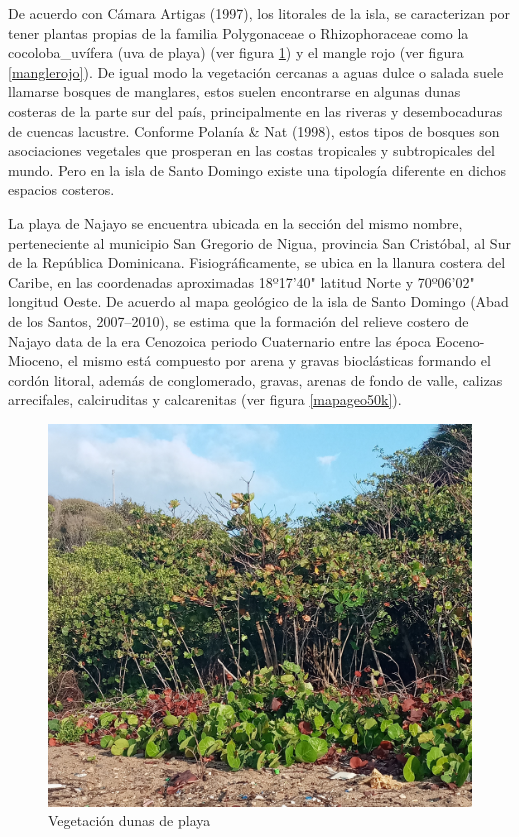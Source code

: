 \documentclass[11pt,]{article}
\begin{document}
De acuerdo con Cámara Artigas (1997), los litorales de la isla, se
caracterizan por tener plantas propias de la familia Polygonaceae o
Rhizophoraceae como la cocoloba\_uvífera (uva de playa) (ver figura
\ref{cocoloba}) y el mangle rojo (ver figura \ref{manglerojo}). De igual
modo la vegetación cercanas a aguas dulce o salada suele llamarse
bosques de manglares, estos suelen encontrarse en algunas dunas costeras
de la parte sur del país, principalmente en las riveras y desembocaduras
de cuencas lacustre. Conforme Polanía \& Nat (1998), estos tipos de
bosques son asociaciones vegetales que prosperan en las costas
tropicales y subtropicales del mundo. Pero en la isla de Santo Domingo
existe una tipología diferente en dichos espacios costeros.

La playa de Najayo se encuentra ubicada en la sección del mismo nombre,
perteneciente al municipio San Gregorio de Nigua, provincia San
Cristóbal, al Sur de la República Dominicana. Fisiográficamente, se
ubica en la llanura costera del Caribe, en las coordenadas aproximadas
18º17'40" latitud Norte y 70º06'02" longitud Oeste. De acuerdo al mapa
geológico de la isla de Santo Domingo (Abad de los Santos, 2007--2010),
se estima que la formación del relieve costero de Najayo data de la era
Cenozoica periodo Cuaternario entre las época Eoceno-Mioceno, el mismo
está compuesto por arena y gravas bioclásticas formando el cordón
litoral, además de conglomerado, gravas, arenas de fondo de valle,
calizas arrecifales, calciruditas y calcarenitas (ver figura
\ref{mapageo50k}).

\begin{figure}
\centering
\includegraphics{Cocoloba_uvifera.jpg}
\caption{Vegetación dunas de playa\label{cocoloba}}
\end{figure}
\end{document}
